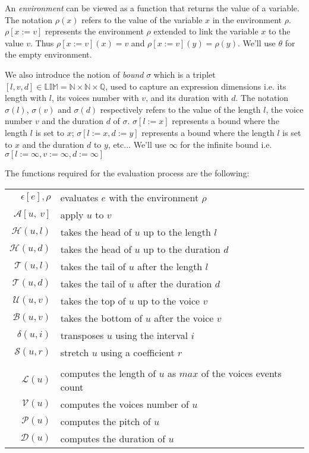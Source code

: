 \documentclass[10pt,a4paper,frenchb]{article}
\newcommand{\bounddomain}{\ensuremath{\mathbb{LIM}}}
\newcommand{\ebounddomain}{\ensuremath{\mathbb{N} \times \mathbb{N} \times \mathbb{Q}}}
\newcommand{\evalsym}			{\ensuremath{\epsilon}}
\newcommand{\envsym}			{\ensuremath{\rho}}
\newcommand{\emptyenv}		{\ensuremath{\theta}}
\newcommand{\applysym}		{\ensuremath{\mathcal A}}
\newcommand{\evalsimple}[1]			{\evalsym\left[#1\right],\rho}
\newcommand{\applysimple}	[2]			{\applysym\left[#1,\ #2\right]}
\newcommand{\length}		{\ensuremath{\mathcal L}}
\newcommand{\voices}		{\ensuremath{\mathcal V}}
\newcommand{\pitch}		{\ensuremath{\mathcal P}}
\newcommand{\dur}			{\ensuremath{\mathcal D}}
\newcommand{\head}			{\ensuremath{\mathcal H}}
\newcommand{\tail}			{\ensuremath{\mathcal T}}
\renewcommand{\top}		{\ensuremath{\mathcal U}}
\newcommand{\bottom}		{\ensuremath{\mathcal B}}
\newcommand{\transp}		{\ensuremath{\delta}}
\renewcommand{\stretch}	{\ensuremath{\mathcal S}}
\newcommand{\bounds}		{\ensuremath{\sigma}}
\newcommand{\nobounds}	{\ensuremath{\infty}}
\begin{document}
An \emph{environment} can be viewed as a function that returns the value of a variable. The notation $\envsym(x)$ refers to the value of the variable $x$ in the environment $\envsym$. $\envsym[x := v]$ represents the environment $\envsym$ extended to link the variable $x$ to the value $v$. Thus $\envsym[x := v](x) = v$ and $\envsym[x := v](y) = \envsym(y)$. We'll use $\emptyenv $ for the empty environment.


We also introduce the notion of \emph{bound} $\bounds$ which is a triplet $[l, v, d] \in \bounddomain = \ebounddomain$, used to capture an expression dimensions i.e. its length with $l$, its voices number with $v$, and its duration with $d$. 
The notation $\bounds(l)$, $\bounds(v)$ and $\bounds(d)$ respectively refers to the value of the length $l$, the voice number $v$ and the duration $d$  of $\bounds$. $\bounds[l := x]$ represents a bound where the length $l$ is set to $x$; $\bounds[l := x, d:=y]$ represents a bound where the length $l$ is set to $x$ and the duration $d$ to $y$, etc... We'll use $\nobounds$ for the infinite bound i.e. $\bounds[l := \infty, v:= \infty, d:= \infty]$



The functions required for the evaluation process are the following:
\begin{center}
\begin{tabular}{rl}
 \hline
 $\evalsimple{e}$ 			& evaluates $e$ with the environment $\envsym$ \\
 $\applysimple{u}{v}$ 	& apply $u$ to $v$ \\
 $\head(u,l)$ 				& takes the head of $u$ up to the length $l$ \\
 $\head(u,d)$ 				& takes the head of $u$ up to the duration $d$ \\
 $\tail(u,l)$ 				& takes the tail of $u$ after the length $l$ \\
 $\tail(u,d)$ 		  & takes the tail of $u$ after the duration $d$ \\
 $\top(u,v)$ 				& takes the top of $u$ up to the voice $v$ \\
 $\bottom(u,v)$ 			& takes the bottom of $u$ after the voice $v$ \\
 $\transp(u,i)$ 		   & transposes $u$ using the interval $i$ \\
 $\stretch(u,r)$ 		   & stretch $u$ using a coefficient $r$ \\
\multicolumn{2}{c}{\dotfill{}} \\
 $\length(u)$ 				& computes the length of $u$ as $max$ of the voices events count \\
 $\voices(u)$ 				& computes the voices number of $u$ \\
 $\pitch(u)$ 				& computes the pitch of $u$ \\
 $\dur(u)$ 				& computes the duration of $u$ \\
 \hline
\end{tabular}
\end{center}
\end{document}
